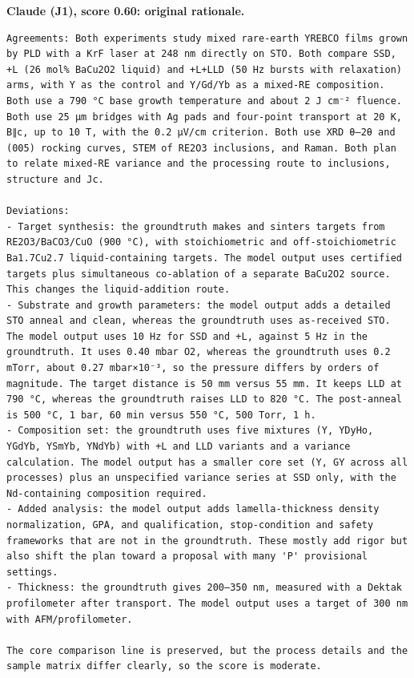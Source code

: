 \noindent\textbf{Claude (J1), score 0.60: original rationale.}
\begin{lstlisting}[style=jsonstyle,basicstyle=\fontsize{8}{9.6}\selectfont\ttfamily,backgroundcolor=\color{white}]
Agreements: Both experiments study mixed rare-earth YREBCO films grown by PLD with a KrF laser at 248 nm directly on STO. Both compare SSD, +L (26 mol% BaCu2O2 liquid) and +L+LLD (50 Hz bursts with relaxation) arms, with Y as the control and Y/Gd/Yb as a mixed-RE composition. Both use a 790 °C base growth temperature and about 2 J cm⁻² fluence. Both use 25 µm bridges with Ag pads and four-point transport at 20 K, B∥c, up to 10 T, with the 0.2 µV/cm criterion. Both use XRD θ–2θ and (005) rocking curves, STEM of RE2O3 inclusions, and Raman. Both plan to relate mixed-RE variance and the processing route to inclusions, structure and Jc.

Deviations:
- Target synthesis: the groundtruth makes and sinters targets from RE2O3/BaCO3/CuO (900 °C), with stoichiometric and off-stoichiometric Ba1.7Cu2.7 liquid-containing targets. The model output uses certified targets plus simultaneous co-ablation of a separate BaCu2O2 source. This changes the liquid-addition route.
- Substrate and growth parameters: the model output adds a detailed STO anneal and clean, whereas the groundtruth uses as-received STO. The model output uses 10 Hz for SSD and +L, against 5 Hz in the groundtruth. It uses 0.40 mbar O2, whereas the groundtruth uses 0.2 mTorr, about 0.27 mbar×10⁻³, so the pressure differs by orders of magnitude. The target distance is 50 mm versus 55 mm. It keeps LLD at 790 °C, whereas the groundtruth raises LLD to 820 °C. The post-anneal is 500 °C, 1 bar, 60 min versus 550 °C, 500 Torr, 1 h.
- Composition set: the groundtruth uses five mixtures (Y, YDyHo, YGdYb, YSmYb, YNdYb) with +L and LLD variants and a variance calculation. The model output has a smaller core set (Y, GY across all processes) plus an unspecified variance series at SSD only, with the Nd-containing composition required.
- Added analysis: the model output adds lamella-thickness density normalization, GPA, and qualification, stop-condition and safety frameworks that are not in the groundtruth. These mostly add rigor but also shift the plan toward a proposal with many 'P' provisional settings.
- Thickness: the groundtruth gives 200–350 nm, measured with a Dektak profilometer after transport. The model output uses a target of 300 nm with AFM/profilometer.

The core comparison line is preserved, but the process details and the sample matrix differ clearly, so the score is moderate.
\end{lstlisting}


